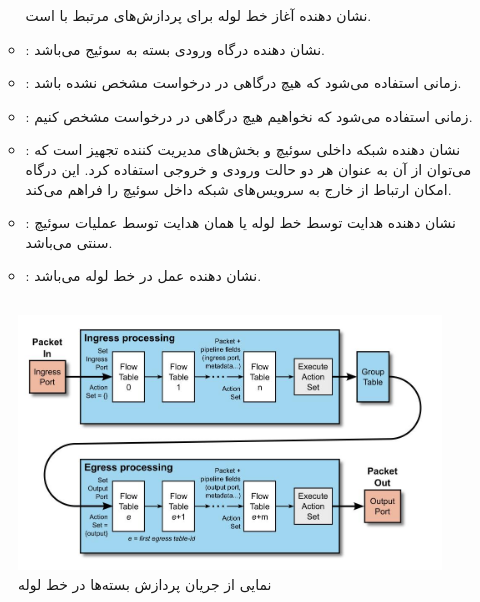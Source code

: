 \begin{itemize}
\begin{itemize}
نشان دهنده آغاز خط لوله برای پردازش‌های مرتبط با  است.
	\item {}:
نشان دهنده درگاه ورودی بسته به سوئیج می‌باشد.
	\item {}:
زمانی استفاده می‌شود که هیچ درگاهی در درخواست  مشخص نشده باشد.
	\item {}:
زمانی استفاده می‌شود که نخواهیم هیچ درگاهی در درخواست  مشخص کنیم.
	\item {}:
نشان دهنده شبکه داخلی سوئیچ و بخش‌های مدیریت کننده تجهیز است که می‌توان از آن به عنوان هر دو حالت ورودی و خروجی استفاده کرد. این درگاه امکان ارتباط از خارج به سرویس‌های شبکه داخل سوئیچ  را فراهم می‌کند.
	\item {}:
نشان دهنده هدایت توسط خط لوله  یا همان هدایت توسط عملیات سوئیچ سنتی می‌باشد.
	\item {}:
نشان دهنده عمل  در خط لوله  می‌باشد.
\end{itemize}
\end{itemize}

\subsection{}

\begin{figure}
	\centering
	\includegraphics[scale=0.5]{imgs/pkt_flow.jpg}
	\caption{نمایی از جریان پردازش بسته‌ها در خط لوله}
	\label{fig5}
\end{figure}

